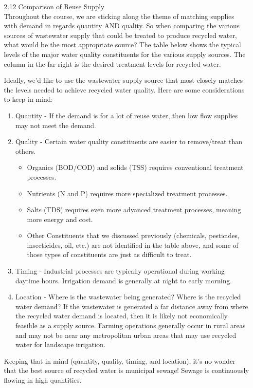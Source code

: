 \documentclass{article}
\begin{document}
2.12 Comparison of Reuse Supply\\
Throughout the course, we are sticking along the theme of matching supplies with demand in regards quantity AND quality.  So when comparing the various sources of wastewater supply that could be treated to produce recycled water, what would be the most appropriate source?
The table below shows the typical levels of the major water quality constituents for the various supply sources.  The column in the far right is the desired treatment levels for recycled water.
  
 
Ideally, we'd like to use the wastewater supply source that most closely matches the levels needed to achieve recycled water quality.  Here are some considerations to keep in mind:
\begin{enumerate}
\item Quantity - If the demand is for a lot of reuse water, then low flow supplies may not meet the demand.
\item Quality - Certain water quality constituents are easier to remove/treat than others. 
\begin{itemize} 
\item Organics (BOD/COD) and solids (TSS) requires conventional treatment processes. 
\item Nutrients (N and P) requires more specialized treatment processes. 
\item Salts (TDS) requires even more advanced treatment processes, meaning more energy and cost.
\item Other Constituents that we discussed previously (chemicals, pesticides, insecticides, oil, etc.) are not identified in the table above, and some of those types of constituents are just as difficult to treat.
\end{itemize}  
\item Timing - Industrial processes are typically operational during working daytime hours.  Irrigation demand is generally at night to early morning.  
\item Location - Where is the wastewater being generated?  Where is the recycled water demand?  If the wastewater is generated a far distance away from where the recycled water demand is located, then it is likely not economically feasible as a supply source.  Farming operations generally occur in rural areas and may not be near any metropolitan urban areas that may use recycled water for landscape irrigation.\\
\end{enumerate}
Keeping that in mind (quantity, quality, timing, and location), it's no wonder that the best source of recycled water is municipal sewage!  Sewage is continuously flowing in high quantities.  \\
\end{document}
